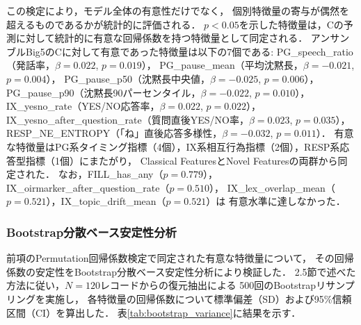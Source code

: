 \documentclass[dvipdfmx,11pt,a4paper]{bxjsarticle}
\begin{document}
この検定により，モデル全体の有意性だけでなく，
個別特徴量の寄与が偶然を超えるものであるかが統計的に評価される．
$p < 0.05$を示した特徴量は，Cの予測に対して統計的に有意な回帰係数を持つ特徴量として同定される．
アンサンブルBig5のCに対して有意であった特徴量は以下の7個である:
PG\_speech\_ratio（発話率，$\beta = 0.022$, $p = 0.019$），
PG\_pause\_mean（平均沈黙長，$\beta = -0.021$, $p = 0.004$），
PG\_pause\_p50（沈黙長中央値，$\beta = -0.025$, $p = 0.006$），
PG\_pause\_p90（沈黙長90パーセンタイル，$\beta = -0.022$, $p = 0.010$），
IX\_yesno\_rate（YES/NO応答率，$\beta = 0.022$, $p = 0.022$），
IX\_yesno\_after\_question\_rate（質問直後YES/NO率，$\beta = 0.023$, $p = 0.035$），
RESP\_NE\_ENTROPY（「ね」直後応答多様性，$\beta = -0.032$, $p = 0.011$）．
有意な特徴量はPG系タイミング指標（4個），IX系相互行為指標（2個），RESP系応答型指標（1個）にまたがり，
Classical FeaturesとNovel Featuresの両群から同定された．
なお，FILL\_has\_any（$p = 0.779$），IX\_oirmarker\_after\_question\_rate（$p = 0.510$），
IX\_lex\_overlap\_mean（$p = 0.521$），IX\_topic\_drift\_mean（$p = 0.521$）は
有意水準に達しなかった．

\subsubsection{Bootstrap分散ベース安定性分析}
\label{sec:result_bootstrap_variance}

前項のPermutation回帰係数検定で同定された有意な特徴量について，
その回帰係数の安定性をBootstrap分散ベース安定性分析により検証した．
2.5節で述べた方法に従い，$N = 120$レコードからの復元抽出による
500回のBootstrapリサンプリングを実施し，
各特徴量の回帰係数について標準偏差（SD）および95\%信頼区間（CI）を算出した．
表\ref{tab:bootstrap_variance}に結果を示す．

\begin{table}[htbp]
\centering
\caption{Bootstrap分散ベース安定性分析結果（アンサンブルBig5, C, 500回リサンプリング）．
各特徴量の平均回帰係数，SD，95\%CI（2.5--97.5パーセンタイル），
およびCIがゼロを除外するか（$\checkmark$: 影響が強い特徴量）を示す．}
\label{tab:bootstrap_variance}

\end{table}
\end{document}
